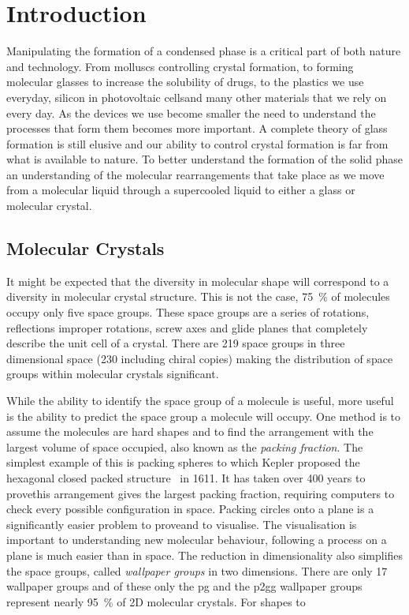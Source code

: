 
\chapter{Introduction}


Manipulating the formation of a condensed phase is a critical part of both nature and technology. From molluscs controlling crystal formation\tocite, to forming molecular glasses to increase the solubility of drugs\tocite, to the plastics we use everyday\tocite, silicon in photovoltaic cells\tocite and many other materials that we rely on every day. As the devices we use become smaller the need to understand the processes that form them becomes more important. A complete theory of glass formation is still elusive and our ability to control crystal formation is far from what is available to nature. To better understand the formation of the solid phase an understanding of the molecular rearrangements that take place as we move from a molecular liquid through a supercooled liquid to either a glass or molecular crystal.

\section{Molecular Crystals}

It might be expected that the diversity in molecular shape will correspond to a diversity in molecular crystal structure. This is not the case, \SI{75}{\percent} of molecules occupy only five space groups\tocite. These space groups are a series of rotations, reflections improper rotations, screw axes and glide planes that completely describe the unit cell of a crystal. There are 219 space groups in three dimensional space (230 including chiral copies) making the distribution of space groups within molecular crystals significant.

While the ability to identify the space group of a molecule is useful, more useful is the ability to predict the space group a molecule will occupy. One method is to assume the molecules are hard shapes and to find the arrangement with the largest volume of space occupied\tocite, also known as the \emph{packing fraction}.  The simplest example of this is packing spheres to which Kepler proposed the hexagonal closed packed structure~\figref{} in 1611\tocite. It has taken over 400 years to prove\tocite this arrangement gives the largest packing fraction, requiring computers to check every possible configuration in space. Packing circles onto a plane is a significantly easier problem to prove\tocite and to visualise\figref{}. The visualisation is important to understanding new molecular behaviour, following a process on a plane is much easier than in space. The reduction in dimensionality also simplifies the space groups, called \emph{wallpaper groups} in two dimensions. There are only 17 wallpaper groups\figref{} and of these only the pg and the p2gg wallpaper groups represent nearly \SI{95}{\percent} of 2D molecular crystals\tocite. For shapes to 

